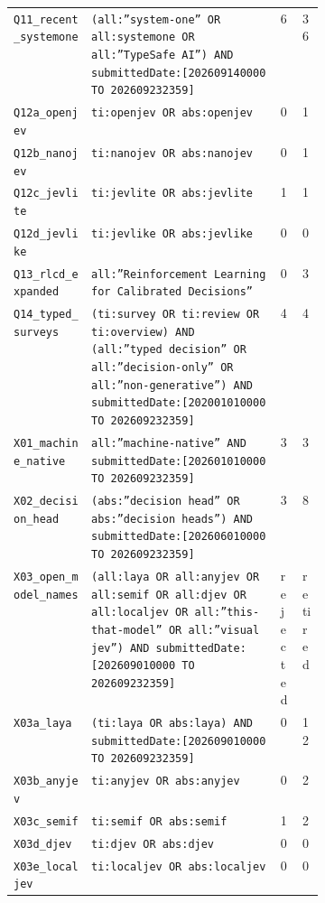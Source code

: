 {\begin{xltabular}{\linewidth}{>{\raggedright\arraybackslash}p{0.25\linewidth}Xp{0.075\linewidth}p{0.075\linewidth}}
\texttt{\footnotesize Q11\_recent\_systemone} & \texttt{\footnotesize (all:”system-one” OR all:systemone OR all:”TypeSafe AI”) AND submittedDate:[202609140000 TO 202609232359]} & 6 & 36 \\
\texttt{\footnotesize Q12a\_openjev} & \texttt{\footnotesize ti:openjev OR abs:openjev} & 0 & 1 \\
\texttt{\footnotesize Q12b\_nanojev} & \texttt{\footnotesize ti:nanojev OR abs:nanojev} & 0 & 1 \\
\texttt{\footnotesize Q12c\_jevlite} & \texttt{\footnotesize ti:jevlite OR abs:jevlite} & 1 & 1 \\
\texttt{\footnotesize Q12d\_jevlike} & \texttt{\footnotesize ti:jevlike OR abs:jevlike} & 0 & 0 \\
\texttt{\footnotesize Q13\_rlcd\_expanded} & \texttt{\footnotesize all:”Reinforcement Learning for Calibrated Decisions”} & 0 & 3 \\
\texttt{\footnotesize Q14\_typed\_surveys} & \texttt{\footnotesize (ti:survey OR ti:review OR ti:overview) AND (all:”typed decision” OR all:”decision-only” OR all:”non-generative”) AND submittedDate:[202001010000 TO 202609232359]} & 4 & 4 \\
\texttt{\footnotesize X01\_machine\_native} & \texttt{\footnotesize all:”machine-native” AND submittedDate:[202601010000 TO 202609232359]} & 3 & 3 \\
\texttt{\footnotesize X02\_decision\_head} & \texttt{\footnotesize (abs:”decision head” OR abs:”decision heads”) AND submittedDate:[202606010000 TO 202609232359]} & 3 & 8 \\
\texttt{\footnotesize X03\_open\_model\_names} & \texttt{\footnotesize (all:laya OR all:anyjev OR all:semif OR all:djev OR all:localjev OR all:”this-that-model” OR all:”visual jev”) AND submittedDate:[202609010000 TO 202609232359]} & rejected & retired \\
\texttt{\footnotesize X03a\_laya} & \texttt{\footnotesize (ti:laya OR abs:laya) AND submittedDate:[202609010000 TO 202609232359]} & 0 & 12 \\
\texttt{\footnotesize X03b\_anyjev} & \texttt{\footnotesize ti:anyjev OR abs:anyjev} & 0 & 2 \\
\texttt{\footnotesize X03c\_semif} & \texttt{\footnotesize ti:semif OR abs:semif} & 1 & 2 \\
\texttt{\footnotesize X03d\_djev} & \texttt{\footnotesize ti:djev OR abs:djev} & 0 & 0 \\
\texttt{\footnotesize X03e\_localjev} & \texttt{\footnotesize ti:localjev OR abs:localjev} & 0 & 0 \\

\end{xltabular}}
